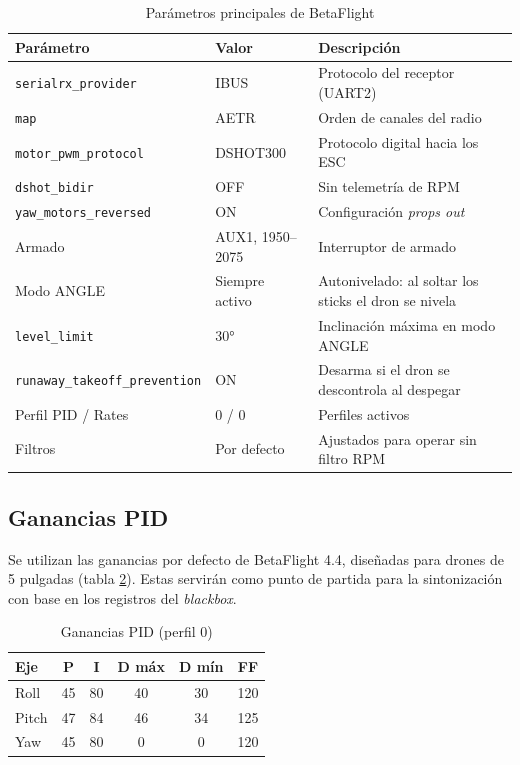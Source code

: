 \documentclass[11pt,letterpaper]{article}
\begin{document}
\begin{table}[!h]
\centering
\caption{Parámetros principales de BetaFlight}
\label{tab:config}
\begin{tabularx}{\textwidth}{@{}llX@{}}
\toprule
\textbf{Parámetro} & \textbf{Valor} & \textbf{Descripción} \\
\midrule
\texttt{serialrx\_provider} & IBUS & Protocolo del receptor (UART2) \\
\texttt{map} & AETR & Orden de canales del radio \\
\texttt{motor\_pwm\_protocol} & DSHOT300 & Protocolo digital hacia los ESC \\
\texttt{dshot\_bidir} & OFF & Sin telemetría de RPM \\
\texttt{yaw\_motors\_reversed} & ON & Configuración \textit{props out} \\
Armado & AUX1, 1950--2075 & Interruptor de armado \\
Modo ANGLE & Siempre activo & Autonivelado: al soltar los sticks el dron se nivela \\
\texttt{level\_limit} & 30° & Inclinación máxima en modo ANGLE \\
\texttt{runaway\_takeoff\_prevention} & ON & Desarma si el dron se descontrola al despegar \\
Perfil PID / Rates & 0 / 0 & Perfiles activos \\
Filtros & Por defecto & Ajustados para operar sin filtro RPM \\
\bottomrule
\end{tabularx}
\end{table}

\subsection{Ganancias PID}
Se utilizan las ganancias por defecto de BetaFlight 4.4, diseñadas para drones de 5 pulgadas (tabla \ref{tab:pid}). Estas servirán como punto de partida para la sintonización con base en los registros del \textit{blackbox}.

\begin{table}[!h]
\centering
\caption{Ganancias PID (perfil 0)}
\label{tab:pid}
\begin{tabular}{@{}lccccc@{}}
\toprule
\textbf{Eje} & \textbf{P} & \textbf{I} & \textbf{D máx} & \textbf{D mín} & \textbf{FF} \\
\midrule
Roll  & 45 & 80 & 40 & 30 & 120 \\
Pitch & 47 & 84 & 46 & 34 & 125 \\
Yaw   & 45 & 80 & 0  & 0  & 120 \\
\bottomrule
\end{tabular}
\end{table}
\end{document}
